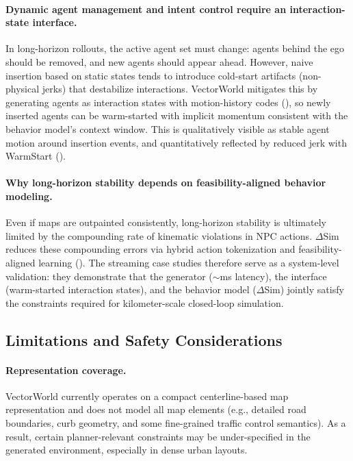 \documentclass{article}
\newcommand{\InteractionState}{interaction-state interface}
\theoremstyle{plain}
\theoremstyle{definition}
\theoremstyle{remark}
\begin{document}
\paragraph{Dynamic agent management and intent control require an \InteractionState.}
In long-horizon rollouts, the active agent set must change: agents behind the ego should be removed, and new agents should appear ahead.
However, naive insertion based on static states tends to introduce cold-start artifacts (non-physical jerks) that destabilize interactions.
VectorWorld mitigates this by generating agents as interaction states with motion-history codes (),
so newly inserted agents can be warm-started with implicit momentum consistent with the behavior model’s context window.
This is qualitatively visible as stable agent motion around insertion events, and quantitatively reflected by reduced jerk with WarmStart
().

\paragraph{Why long-horizon stability depends on feasibility-aligned behavior modeling.}
Even if maps are outpainted consistently, long-horizon stability is ultimately limited by the compounding rate of kinematic violations in NPC actions.
\(\Delta\)Sim reduces these compounding errors via hybrid action tokenization and feasibility-aligned learning ().
The streaming case studies therefore serve as a system-level validation: they demonstrate that the generator (\(\sim\)ms latency),
the interface (warm-started interaction states), and the behavior model (\(\Delta\)Sim) jointly satisfy the constraints required for
kilometer-scale closed-loop simulation.

\subsection{Limitations and Safety Considerations}
\label{app:limitations}

\paragraph{Representation coverage.}
VectorWorld currently operates on a compact centerline-based map representation and does not model all map elements
(e.g., detailed road boundaries, curb geometry, and some fine-grained traffic control semantics).
As a result, certain planner-relevant constraints may be under-specified in the generated environment, especially in dense urban layouts.
\end{document}

